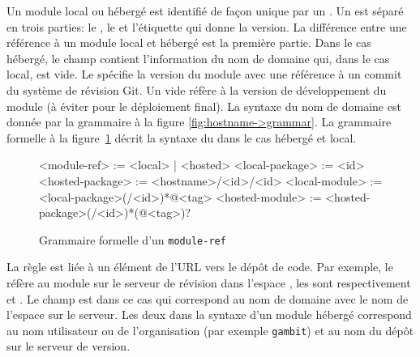 Un module local ou hébergé est identifié de façon unique par un
.  Un  est séparé en trois parties: le
, le  et l'étiquette qui donne la version.  La
différence entre une référence à un module local et hébergé est la première
partie. Dans le cas hébergé, le champ  contient l'information
du nom de domaine qui, dans le cas local, est vide.  Le 
spécifie la version du module avec une référence à un commit du système de
révision Git. Un  vide réfère à la version de développement du
module (à éviter pour le déploiement final).  La syntaxe du nom de domaine est
donnée par la grammaire à la figure \ref{fig:hostname->grammar}.  La grammaire
formelle à la figure~\ref{fig:module-ref->grammar} décrit la syntaxe du
 dans le cas hébergé et local.\\

\begin{figure}[ht]
  \lstset{frame=single}
  \begin{mplisting}{0.8}
<module-ref>       := <local> | <hosted>
<local-package>    := <id>
<hosted-package>   := <hostname>/<id>/<id>
<local-module>     := <local-package>(/<id>)*@<tag>
<hosted-module>    := <hosted-package>(/<id>)*(@<tag>)?
\end{mplisting}
  \caption{Grammaire formelle d'un \texttt{module-ref}}
  \label{fig:module-ref->grammar}
\end{figure}

La règle  est liée à un élément de l'URL vers le dépôt de
code. Par exemple, le  
réfère au module  sur le serveur de révision
 dans l'espace , les  sont
respectivement  et . Le champ  est
dans ce cas  qui correspond au nom de domaine avec
le nom de l'espace sur le serveur. Les deux  dans la syntaxe
d'un module hébergé correspond au nom utilisateur ou de l'organisation (par
exemple \texttt{gambit}) et au nom du dépôt sur le serveur de version.


